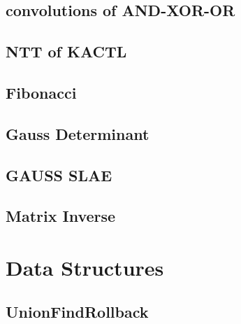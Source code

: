 \subsection{convolutions of AND-XOR-OR}
\vspace{-2ex}
\raggedbottom
\vspace{-3.2ex}
\hrulefill
\subsection{NTT of KACTL}
\vspace{-2ex}
\raggedbottom
\vspace{-3.2ex}
\hrulefill
\subsection{Fibonacci}
\vspace{-2ex}
\raggedbottom
\vspace{-3.2ex}
\hrulefill
\subsection{Gauss Determinant}
\vspace{-2ex}
\raggedbottom
\vspace{-3.2ex}
\hrulefill
\subsection{GAUSS SLAE}
\vspace{-2ex}
\raggedbottom
\vspace{-3.2ex}
\hrulefill
\subsection{Matrix Inverse}
\vspace{-2ex}
\raggedbottom
\vspace{-3.2ex}
\hrulefill

\section{Data Structures}
\subsection{UnionFindRollback}
\vspace{-2ex}
\raggedbottom
\vspace{-3.2ex}
\hrulefill
